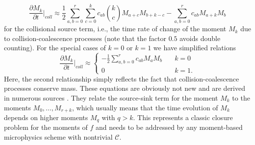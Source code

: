 \documentclass{report}
\begin{document}
\begin{equation}
\frac{\partial M_k}{\partial t} \biggr\rvert_{coll} \approx
    \frac{1}{2} \sum_{a,b=0}^{r} \sum_{c=0}^k c_{ab} {k \choose c} M_{a+c} M_{b+k-c} - \sum_{a,b=0}^{r} c_{ab} M_{a+k} M_b
\label{eq:source_co_mom_approx}
\end{equation}
for the collisional source term, i.e., the time rate of change of the  moment $M_k$ due to collision-coalescence processes (note that the factor $0.5$ avoids double counting). For the special cases of $k=0$ or $k=1$ we have simplified relations
\begin{equation}
    \frac{\partial M_k}{\partial t} \biggr\rvert_{coll} \approx
    \begin{cases}
    -\frac{1}{2} \sum_{a,b=0}^{r} c_{ab} M_a M_b & \quad k=0\\
    0 & \quad k = 1.
    \end{cases}
\end{equation}
Here, the second relationship simply reflects the fact that collision-coalescence processes conserve mass. These equations are obviously not new and are derived in numerous sources \citep[cf.][]{Pruppacher1978, Beheng2010}. They relate the source-sink term for the moment $M_k$ to the moments $M_0, \dots, M_{r+k}$, which usually means that the time evolution of $M_k$ depends on higher moments $M_q$ with $q>k$. This represents a classic closure problem for the moments of $f$ and needs to be addressed by any moment-based microphysics scheme with nontrivial $\mathcal{C}$.
\end{document}
